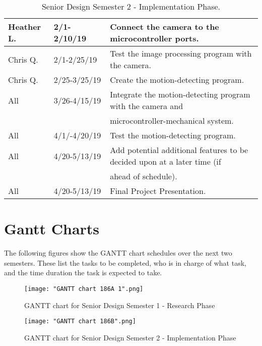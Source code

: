 \begin{table} [H]
\begin{tabular}{|l|l|l|}
		\hline
		Heather L. & 2/1-2/10/19 & Connect the camera to the microcontroller ports.\\
		\hline
		Chris Q. & 2/1-2/25/19 & Test the image processing program with the camera.\\
		\hline
		Chris Q. & 2/25-3/25/19 & Create the motion-detecting program.\\
		\hline
		All & 3/26-4/15/19 & Integrate the motion-detecting program with the camera and \\
		& & microcontroller-mechanical system.\\
		\hline
		All & 4/1/-4/20/19 & Test the motion-detecting program.\\
		\hline
		All & 4/20-5/13/19 & 
		Add potential additional features to be decided upon at a later time (if \\
		& & ahead of schedule).\\
		\hline
		All & 4/20-5/13/19 & 
		Final Project Presentation.\\
		\hline
	\end{tabular} 
	\caption{Senior Design Semester 2 - Implementation Phase.}
	\label{table:3}
\end{table}
\section{Gantt Charts}
The following figures show the GANTT chart schedules over the next two semesters. These list the tasks to be completed, who is in charge of what task, and the time duration the task is expected to take.
\begin{figure}[h!]
	\centering
	\texttt{[image: "GANTT chart 186A 1".png]}
	\caption{GANTT chart for Senior Design Semester 1 - Research Phase}
	\label{fig:GANTT186A}
\end{figure}

\begin{figure}[h!]
	\centering
	{\texttt{[image: "GANTT chart 186B".png]}}
	\caption{GANTT chart for Senior Design Semester 2 - Implementation Phase}
	\label{fig:GANTT186B}
\end{figure}

